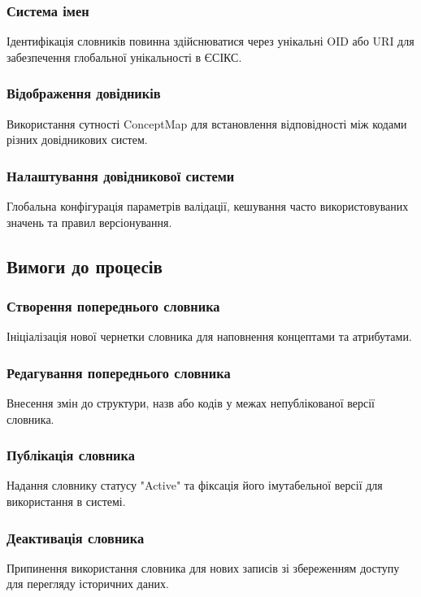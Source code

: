 \documentclass{article}
\begin{document}
\subsubsection{Система імен}
Ідентифікація словників повинна здійснюватися через унікальні OID або URI для забезпечення глобальної унікальності в ЄСІКС.

\subsubsection{Відображення довідників}
Використання сутності ConceptMap для встановлення відповідності між кодами різних довідникових систем.

\subsubsection{Налаштування довідникової системи}
Глобальна конфігурація параметрів валідації, кешування часто використовуваних значень та правил версіонування.

\newpage
\subsection{Вимоги до процесів}

\subsubsection{Створення попереднього словника}
Ініціалізація нової чернетки словника для наповнення концептами та атрибутами.

\subsubsection{Редагування попереднього словника}
Внесення змін до структури, назв або кодів у межах непублікованої версії словника.

\subsubsection{Публікація словника}
Надання словнику статусу "Active" та фіксація його імутабельної версії для використання в системі.

\subsubsection{Деактивація словника}
Припинення використання словника для нових записів зі збереженням доступу для перегляду історичних даних.
\end{document}

